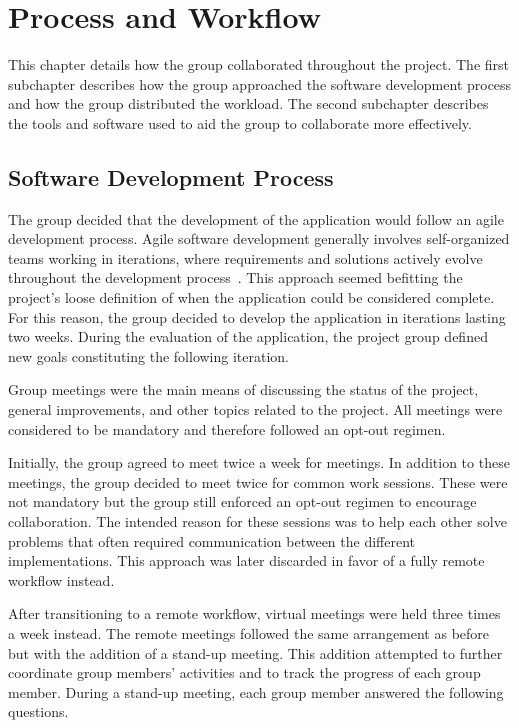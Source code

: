 \section{Process and Workflow}
This chapter details how the group collaborated throughout the project.
The first subchapter describes how the group approached the software development process and how the group distributed the workload.
The second subchapter describes the tools and software used to aid the group to collaborate more effectively.

\subsection{Software Development Process}
The group decided that the development of the application would follow an agile development process.
Agile software development generally involves self-organized teams working in iterations, where requirements and solutions actively evolve throughout the development process~\cite{agile101}.
This approach seemed befitting the project's loose definition of when the application could be considered complete.
For this reason, the group decided to develop the application in iterations lasting two weeks.
During the evaluation of the application, the project group defined new goals constituting the following iteration.

Group meetings were the main means of discussing the status of the project, general improvements, and other topics related to the project.
All meetings were considered to be mandatory and therefore followed an opt-out regimen.

Initially, the group agreed to meet twice a week for meetings.
In addition to these meetings, the group decided to meet twice for common work sessions.
These were not mandatory but the group still enforced an opt-out regimen to encourage collaboration.
The intended reason for these sessions was to help each other solve problems that often required communication between the different implementations.
This approach was later discarded in favor of a fully remote workflow instead.

After transitioning to a remote workflow, virtual meetings were held three times a week instead.
The remote meetings followed the same arrangement as before but with the addition of a stand-up meeting.
This addition attempted to further coordinate group members' activities and to track the progress of each group member.
During a stand-up meeting, each group member answered the following questions.

